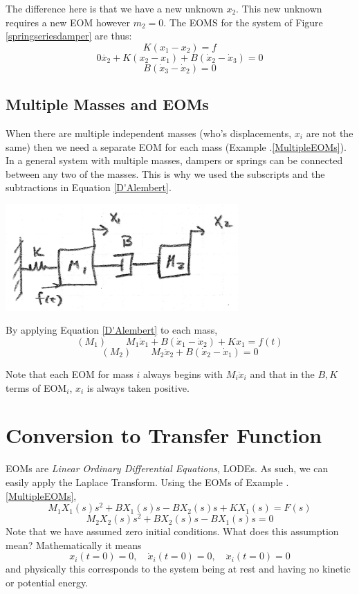 The difference here is that we have a new unknown $x_2$.    This new unknown requires a new EOM however $m_2 =0$.   The EOMS for the system of Figure \ref{springseriesdamper} are thus:
\[
K(x_1-x_2) = f
\]
\[
0\ddot{x_2} + K(x_2-x_1) + B(\dot{x}_2-\dot{x}_3) = 0
\]
\[
B(\dot{x}_3-\dot{x}_2) = 0
\]






\subsection{Multiple Masses and EOMs}
When there are multiple independent masses (who's displacements, $x_i$ are not the same) then we need a separate EOM for each mass (Example \thechapter.\ref{MultipleEOMs}).
In a general system with multiple masses, dampers or springs can be connected between any two of the masses.  This is why we used the subscripts and the subtractions in Equation \ref{D'Alembert}.



\begin{ExampleSmall}\label{MultipleEOMs}


\includegraphics[width=3.5in]{figs02/00726a.png}



By applying Equation \ref{D'Alembert} to each mass,
\[
(M_1) \qquad M_1\ddot{x}_1 + B(\dot{x}_1 - \dot{x}_2) + Kx_1 = f(t)
\]
\[
(M_2) \qquad M_2\ddot{x}_2 + B(\dot{x}_2-\dot{x}_1)  = 0
\]

Note that each EOM for mass $i$ always begins with $M_i\ddot{x}_i$ and that in the $B,K$ terms of EOM$_i$, $x_i$ is always taken positive.
\end{ExampleSmall}





\section{Conversion to Transfer Function}

EOMs are {\it Linear Ordinary Differential Equations}, LODEs.  As such, we can easily apply the Laplace Transform.
Using the EOMs of Example \thechapter.\ref{MultipleEOMs},
\[
M_1X_1(s)s^2 + BX_1(s)s - BX_2(s)s + KX_1(s) = F(s)
\]
\[
M_2X_2(s)s^2 + BX_2(s)s - BX_1(s)s = 0
\]
Note that we have assumed zero initial conditions.   What does this assumption mean?  Mathematically it means
\[
x_i(t=0) = 0, \quad \dot{x}_i(t=0) = 0, \quad \ddot{x}_i(t=0) = 0
\]
and physically this corresponds to the system being at rest and having no kinetic or potential energy.

